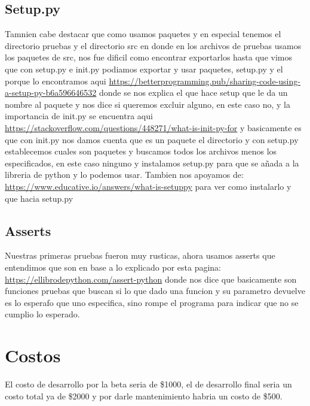 \documentclass[12pt]{article}
\begin{document}
\subsection{Setup.py}
Tamnien cabe destacar que como usamos paquetes y en especial tenemos el directorio pruebas y el directorio src en donde en los archivos de pruebas usamos los paquetes de src, nos fue dificil como encontrar exportarlos hasta que vimos que con setup.py e init.py podiamos exportar y usar paquetes, setup.py y el porque lo encontramos aqui \url{https://betterprogramming.pub/sharing-code-using-a-setup-py-b6a596646532} donde se nos explica el que hace setup que le da un nombre al paquete y nos dice si queremos excluir alguno, en este caso no, y la importancia de init.py se encuentra aqui \url{https://stackoverflow.com/questions/448271/what-is-init-py-for} y basicamente es que con init.py nos damos cuenta que es un paquete el directorio y con setup.py establecemos cuales son paquetes y buscamos todos los archivos menos los especificados, en este caso ninguno y instalamos setup.py para que se añada a la libreria de python y lo podemos usar. Tambien nos apoyamos de: \url{https://www.educative.io/answers/what-is-setuppy} para ver como instalarlo y que hacia setup.py
\subsection{Asserts}
Nuestras primeras pruebas fueron muy rusticas, ahora usamos asserts que entendimos que son en base a lo explicado por esta pagina: \url{https://ellibrodepython.com/assert-python} donde nos dice que basicamente son funciones pruebas que buscan si lo que dado una funcion y su parametro devuelve es lo esperafo que uno especifica, sino rompe el programa para indicar que no se cumplio lo esperado.
\section{Costos}
El costo de desarrollo por la beta seria de \$1000, el de desarrollo final seria un costo total ya de \$2000 y por darle mantenimiento habria un costo de \$500.
\end{document}

